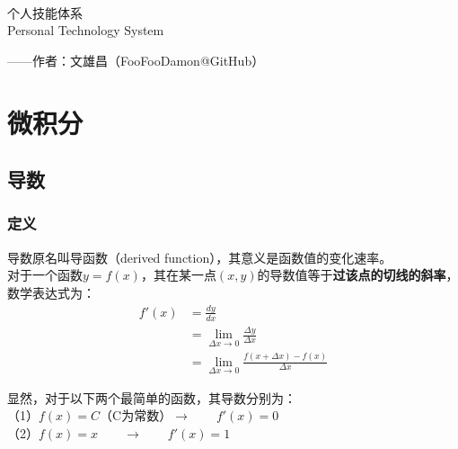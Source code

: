\documentclass[12pt]{article}
\begin{document}
\begin{center}
\quad\vspace{4cm}\\
\Huge{个人技能体系}\vspace{8pt}\\
\Large{Personal Technology System}\vspace{32pt}\\
\end{center}
\begin{flushright}
\large{——作者：文雄昌（FooFooDamon@GitHub）\qquad}
\end{flushright}


\newpage

\renewcommand{\contentsname}{目录}
\begin{center}
\tableofcontents
\end{center}
\newpage

\section{微积分}

\subsection{导数}

\subsubsection{定义}

导数原名叫导函数（derived function），其意义是函数值的变化速率。\\
对于一个函数$y = f(x)$，其在某一点$(x, y)$的导数值等于\textbf{过该点的切线的斜率}，数学表达式为：\\

\begin{equation*}
\begin{aligned}
f'(x) & = \frac{dy}{dx}\\
& = \lim_{\Delta x \to 0}\frac{\Delta y}{\Delta x}\\
& = \lim_{\Delta x \to 0}\frac{f(x + \Delta x) - f(x)}{\Delta x}
\end{aligned}
\end{equation*}

显然，对于以下两个最简单的函数，其导数分别为：\\
（1）$f(x) = C$（C为常数）\qquad $\to \qquad f'(x) = 0$\\
（2）$f(x) = x \qquad \to \qquad f'(x) = 1$
\end{document}
